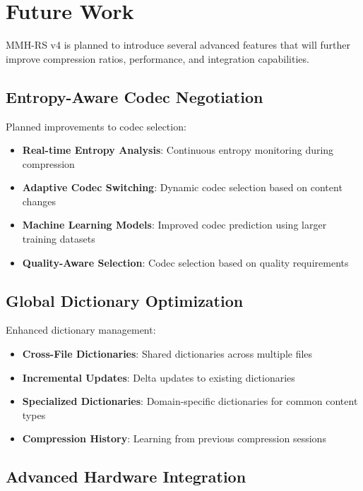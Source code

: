 \documentclass[11pt,a4paper]{article}
\begin{document}
	\section{Future Work}
	\label{sec:future}
	
	MMH-RS v4 is planned to introduce several advanced features that will further improve compression ratios, performance, and integration capabilities.
	
	\subsection{Entropy-Aware Codec Negotiation}
	
	Planned improvements to codec selection:
	\begin{itemize}
		\item \textbf{Real-time Entropy Analysis}: Continuous entropy monitoring during compression
		\item \textbf{Adaptive Codec Switching}: Dynamic codec selection based on content changes
		\item \textbf{Machine Learning Models}: Improved codec prediction using larger training datasets
		\item \textbf{Quality-Aware Selection}: Codec selection based on quality requirements
	\end{itemize}
	
	\subsection{Global Dictionary Optimization}
	
	Enhanced dictionary management:
	\begin{itemize}
		\item \textbf{Cross-File Dictionaries}: Shared dictionaries across multiple files
		\item \textbf{Incremental Updates}: Delta updates to existing dictionaries
		\item \textbf{Specialized Dictionaries}: Domain-specific dictionaries for common content types
		\item \textbf{Compression History}: Learning from previous compression sessions
	\end{itemize}
	
	\subsection{Advanced Hardware Integration}
	
\end{document}

